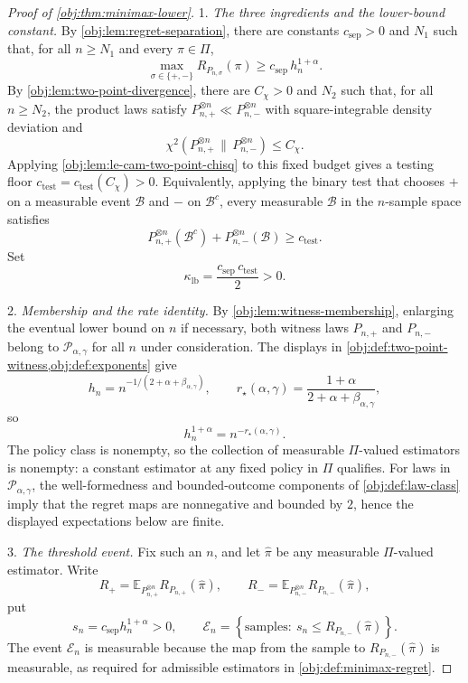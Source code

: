 \documentclass[11pt]{article}
\begin{document}
\begin{proof}[Proof of \cref{obj:thm:minimax-lower}]
1. \emph{The three ingredients and the lower-bound constant.}  By \cref{obj:lem:regret-separation}, there are constants \(c_{\mathrm{sep}}>0\) and \(N_1\) such that, for all \(n\ge N_1\) and every \(\pi\in\Pi\),
\[
\max_{\sigma\in\{+,-\}} R_{P_{n,\sigma}}(\pi)
\ge
c_{\mathrm{sep}}\,h_n^{1+\alpha}.
\]
By \cref{obj:lem:two-point-divergence}, there are \(C_\chi>0\) and \(N_2\) such that, for all \(n\ge N_2\), the product laws satisfy \(P_{n,+}^{\otimes n}\ll P_{n,-}^{\otimes n}\) with square-integrable density deviation and
\[
\chi^2(P_{n,+}^{\otimes n}\,\|\,P_{n,-}^{\otimes n})\le C_\chi .
\]
Applying \cref{obj:lem:le-cam-two-point-chisq} to this fixed budget gives a testing floor \(c_{\mathrm{test}}=c_{\mathrm{test}}(C_\chi)>0\).  Equivalently, applying the binary test that chooses \(+\) on a measurable event \(\mathcal B\) and \(-\) on \(\mathcal B^c\), every measurable \(\mathcal B\) in the \(n\)-sample space satisfies
\[
P_{n,+}^{\otimes n}(\mathcal B^c)+P_{n,-}^{\otimes n}(\mathcal B)
\ge c_{\mathrm{test}} .
\]
Set
\[
\kappa_{\mathrm{lb}}=\frac{c_{\mathrm{sep}}\,c_{\mathrm{test}}}{2}>0 .
\]

2. \emph{Membership and the rate identity.}  By \cref{obj:lem:witness-membership}, enlarging the eventual lower bound on \(n\) if necessary, both witness laws \(P_{n,+}\) and \(P_{n,-}\) belong to \(\mathcal P_{\alpha,\gamma}\) for all \(n\) under consideration.  The displays in \cref{obj:def:two-point-witness,obj:def:exponents} give
\[
h_n=n^{-1/(2+\alpha+\beta_{\alpha,\gamma})},
\qquad
r_\star(\alpha,\gamma)=\frac{1+\alpha}{2+\alpha+\beta_{\alpha,\gamma}},
\]
so
\[
h_n^{1+\alpha}=n^{-r_\star(\alpha,\gamma)} .
\]
The policy class is nonempty, so the collection of measurable \(\Pi\)-valued estimators is nonempty: a constant estimator at any fixed policy in \(\Pi\) qualifies.  For laws in \(\mathcal P_{\alpha,\gamma}\), the well-formedness and bounded-outcome components of \cref{obj:def:law-class} imply that the regret maps are nonnegative and bounded by \(2\), hence the displayed expectations below are finite. %

3. \emph{The threshold event.}  Fix such an \(n\), and let \(\widehat\pi\) be any measurable \(\Pi\)-valued estimator.  Write
\[
R_+
=
\mathbb E_{P_{n,+}^{\otimes n}} R_{P_{n,+}}(\widehat\pi),
\qquad
R_-
=
\mathbb E_{P_{n,-}^{\otimes n}} R_{P_{n,-}}(\widehat\pi),
\]
put
\[
s_n=c_{\mathrm{sep}}h_n^{1+\alpha}>0,
\qquad
\mathcal E_n=\left\{\text{samples}:\ s_n\le R_{P_{n,-}}(\widehat\pi)\right\}.
\]
The event \(\mathcal E_n\) is measurable because the map from the sample to \(R_{P_{n,-}}(\widehat\pi)\) is measurable, as required for admissible estimators in \cref{obj:def:minimax-regret}. %


\end{proof}
\end{document}
